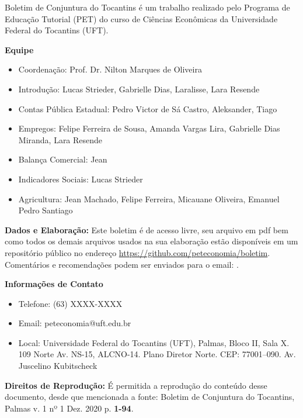 \begin{tcolorbox}[colback=boxbackground, colframe=boxbackground, arc=0mm, top=15pt]
Boletim de Conjuntura do Tocantins é um trabalho realizado pelo Programa de Educação Tutorial (PET) do curso de Ciências Econômicas da Universidade Federal do Tocantins (UFT).
\\
\par{\bf Equipe}
\begin{itemize}
	\item Coordenação: Prof. Dr. Nilton Marques de Oliveira
	\item Introdução: Lucas Strieder, Gabrielle Dias, Laralisse, Lara Resende
	\item Contas Pública Estadual: Pedro Victor de Sá Castro, Aleksander, Tiago
	\item Empregos: Felipe Ferreira de Sousa, Amanda Vargas Lira, Gabrielle Dias Miranda, Lara Resende
	\item Balança Comercial: Jean
	\item Indicadores Sociais: Lucas Strieder
	\item Agricultura: Jean Machado, Felipe Ferreira, Micauane Oliveira, Emanuel Pedro Santiago
\end{itemize}
\par{\bf Dados e Elaboração:}
Este boletim é de acesso livre, seu arquivo em pdf bem como todos os demais arquivos usados na sua elaboração estão disponíveis em um repositório público no endereço \url{https://github.com/peteconomia/boletim}. Comentários e recomendações podem ser enviados para o email: .
\\
\par{\bf Informações de Contato}
\begin{itemize}
	\item{Telefone:} (63) XXXX-XXXX
	\item{Email: peteconomia@uft.edu.br} 
	\item{Local:} Universidade Federal do Tocantins (UFT), Palmas, Bloco II, Sala X. 109 Norte Av. NS-15, ALCNO-14. Plano Diretor Norte. CEP: 77001--090. Av. Juscelino Kubitscheck
\end{itemize}
\par{\bf Direitos de Reprodução:}
É permitida a reprodução do conteúdo desse documento, desde que mencionada a fonte: Boletim de Conjuntura do Tocantins, Palmas v. 1 nº 1 Dez. 2020 p. \textbf{1-94}.
\end{tcolorbox}


